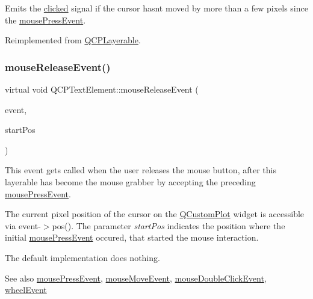 Emits the \hyperlink{class_q_c_p_text_element_ad2246a0e701c0655623f048737298334}{clicked} signal if the cursor hasn\textquotesingle{}t moved by more than a few pixels since the \hyperlink{class_q_c_p_text_element_ad7b2c98355e3d2f912574b74fcee0574}{mouse\+Press\+Event}.

Reimplemented from \hyperlink{class_q_c_p_layerable_aa0d79b005686f668622bbe66ac03ba2c}{Q\+C\+P\+Layerable}.

\mbox{\label{class_q_c_p_text_element_a97d566f46653bb0b00a2c1556e6c1f7e}} 
\subsubsection{\texorpdfstring{mouse\+Release\+Event()}{mouseReleaseEvent()}\hspace{0.1cm}{\footnotesize\ttfamily [2/2]}}
{\footnotesize\ttfamily virtual void Q\+C\+P\+Text\+Element\+::mouse\+Release\+Event (\begin{DoxyParamCaption}\item[{Q\+Mouse\+Event $\ast$}]{event,  }\item[{const Q\+PointF \&}]{start\+Pos }\end{DoxyParamCaption})\hspace{0.3cm}{\ttfamily [virtual]}}

This event gets called when the user releases the mouse button, after this layerable has become the mouse grabber by accepting the preceding \hyperlink{class_q_c_p_text_element_ad7b2c98355e3d2f912574b74fcee0574}{mouse\+Press\+Event}.

The current pixel position of the cursor on the \hyperlink{class_q_custom_plot}{Q\+Custom\+Plot} widget is accessible via {\ttfamily event-\/$>$pos()}. The parameter {\itshape start\+Pos} indicates the position where the initial \hyperlink{class_q_c_p_text_element_ad7b2c98355e3d2f912574b74fcee0574}{mouse\+Press\+Event} occured, that started the mouse interaction.

The default implementation does nothing.

\begin{DoxySeeAlso}{See also}
\hyperlink{class_q_c_p_text_element_ad7b2c98355e3d2f912574b74fcee0574}{mouse\+Press\+Event}, \hyperlink{class_q_c_p_layerable_a9eee1ba47fd69be111059ca3881933e4}{mouse\+Move\+Event}, \hyperlink{class_q_c_p_text_element_a2272ff775ab385f612e9fd39773de7c0}{mouse\+Double\+Click\+Event}, \hyperlink{class_q_c_p_layerable_a47dfd7b8fd99c08ca54e09c362b6f022}{wheel\+Event} 
\end{DoxySeeAlso}


